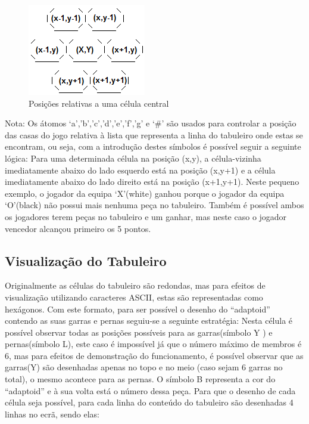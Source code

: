 \documentclass[a4paper]{article}
\begin{document}
\begin{figure}[h]
    \begin{center}
        \includegraphics[scale=0.5]{posicoesRelativas}
        \caption{Posições relativas a uma célula central}
        \centering
    \end{center}
\end{figure}
Nota: Os átomos ‘a’,’b’,’c’,'d','e','f','g' e ‘\#’ são usados para controlar a posição das casas do jogo relativa à lista que representa a linha do tabuleiro onde estas se encontram, ou seja, com a introdução destes símbolos é possível seguir a seguinte lógica: Para uma determinada célula na posição (x,y), a célula-vizinha imediatamente abaixo do lado esquerdo está na posição (x,y+1) e a célula imediatamente abaixo do lado direito está na posição (x+1,y+1). Neste pequeno exemplo, o jogador da equipa ‘X’(white) ganhou porque o jogador da equipa ‘O’(black) não possui mais nenhuma peça no tabuleiro. Também é possível ambos os jogadores terem peças no tabuleiro e um ganhar, mas neste caso o jogador vencedor alcançou primeiro os 5 pontos.



\newpage

\subsection{Visualização do Tabuleiro} Originalmente as células do tabuleiro são redondas, mas para efeitos de visualização utilizando caracteres ASCII, estas são representadas como hexágonos. Com este formato, para ser possível o desenho do “adaptoid” contendo as suas garras e pernas seguiu-se a seguinte estratégia: Nesta célula é possível observar todas as posições possíveis para as garras(símbolo Y ) e pernas(símbolo L), este caso é impossível já que o número máximo de membros é 6, mas para efeitos de demonstração do funcionamento, é possível observar que as garras(Y) são desenhadas apenas no topo e no meio (caso sejam 6 garras no total), o mesmo acontece para as pernas. O símbolo B representa a cor do “adaptoid” e à sua volta está o número dessa peça.
Para que o desenho de cada célula seja possível, para cada linha do conteúdo do tabuleiro são desenhadas 4 linhas no ecrã, sendo elas:
\end{document}
